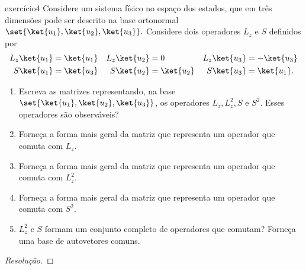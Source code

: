 \begin{exercício}{}{exercício4}
    Considere um sistema físico no espaço dos estados, que em três dimensões pode ser descrito na base ortonormal \(\set{\ket{u_1}, \ket{u_2}, \ket{u_3}}.\) Considere dois operadores \(L_z\) e \(S\) definidos por
    \begin{align*}
        L_z\ket{u_1} & = \ket{u_1}&
        L_z\ket{u_2} & = 0&
        L_z\ket{u_3} & = -\ket{u_3}\\
        S\ket{u_1} & = \ket{u_3}&
        S\ket{u_2} & = \ket{u_2}&
        S\ket{u_3} & = \ket{u_1}.
    \end{align*}
    \begin{enumerate}[label=(\alph*)]
        \item Escreva as matrizes representando, na base \(\set{\ket{u_1}, \ket{u_2}, \ket{u_3}}\), os operadores \(L_z, L_z^2, S\) e \(S^2\). Esses operadores são observáveis?
        \item Forneça a forma mais geral da matriz que representa um operador que comuta com \(L_z\).
        \item Forneça a forma mais geral da matriz que representa um operador que comuta com \(L_z^2\).
        \item Forneça a forma mais geral da matriz que representa um operador que comuta com \(S^2\).
        \item \(L_z^2\) e \(S\) formam um conjunto completo de operadores que comutam? Forneça uma base de autovetores comuns.
    \end{enumerate}
\end{exercício}
\begin{proof}[Resolução]

\end{proof}
